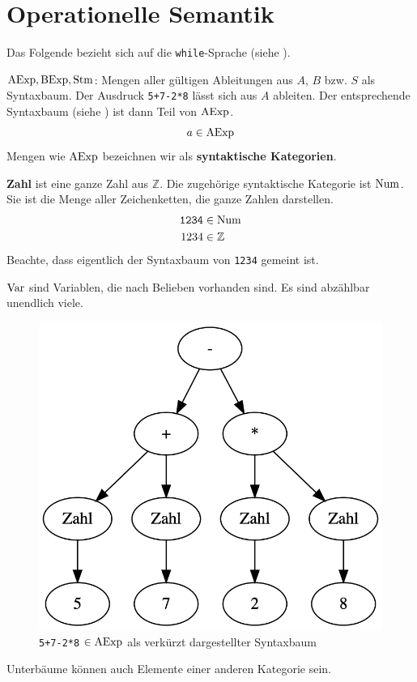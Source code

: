 \section{Operationelle Semantik}

Das Folgende bezieht sich auf die \texttt{while}-Sprache (siehe ).

\begin{definition}
    $\operatorname{AExp}, \operatorname{BExp}, \operatorname{Stm}$: Mengen aller gültigen Ableitungen aus $A$, $B$ bzw. $S$ als Syntaxbaum. Der Ausdruck \texttt{5+7-2*8} lässt sich aus $A$ ableiten. Der entsprechende Syntaxbaum (siehe ) ist dann Teil von $\operatorname{AExp}$.
    \[
    a \in \operatorname{AExp}
    \]
    Mengen wie $\operatorname{AExp}$ bezeichnen wir als \textbf{syntaktische Kategorien}.

    \textbf{Zahl} ist eine ganze Zahl aus $\mathbb{Z}$. Die zugehörige syntaktische Kategorie ist $\operatorname{Num}$. Sie ist die Menge aller Zeichenketten, die ganze Zahlen darstellen.
    \begin{align*}
        \texttt{1234} & \in \operatorname{Num} \\
        1234 & \in \mathbb{Z}
    \end{align*}
    Beachte, dass eigentlich der Syntaxbaum von \texttt{1234} gemeint ist.

    $\operatorname{Var}$ sind Variablen, die nach Belieben vorhanden sind. Es sind abzählbar unendlich viele.
\end{definition}

\begin{figure}[H]
    \centering
    \includegraphics[width=.4\textwidth]{img/syntaxbaum.png}
    \caption{\texttt{5+7-2*8} $\in \operatorname{AExp}$ als verkürzt dargestellter Syntaxbaum}
    \label{fig:syntaxbaum}
\end{figure}

\begin{remark}
    Unterbäume können auch Elemente einer anderen Kategorie sein.
\end{remark}

